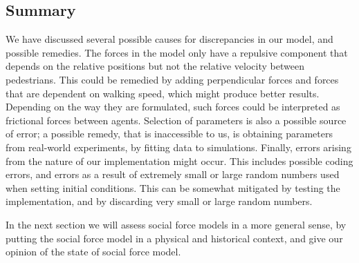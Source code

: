 \subsection{Summary}
We have discussed several possible causes for discrepancies in our model, and 
possible remedies. The forces in the model only have a repulsive component that 
depends on the relative positions but not the relative velocity between pedestrians. 
This could be remedied by adding 
perpendicular forces and forces that are dependent on walking speed, which 
might produce better results. Depending on the way they are formulated, such 
forces could be interpreted as frictional forces between agents. Selection of 
parameters is also a possible source of error; a possible remedy, that is 
inaccessible to us, is obtaining parameters from real-world experiments, by 
fitting data to simulations. Finally, errors arising from the nature of our 
implementation might occur. This includes possible coding errors, and errors 
as a result of extremely small or large random numbers used when setting 
initial conditions. This can be somewhat mitigated by testing the 
implementation, and by discarding very small or large random numbers.

In the next section we will assess social force models in a more general sense, 
by putting the social force model in a physical and historical context, and give 
our opinion of the state of social force model.
